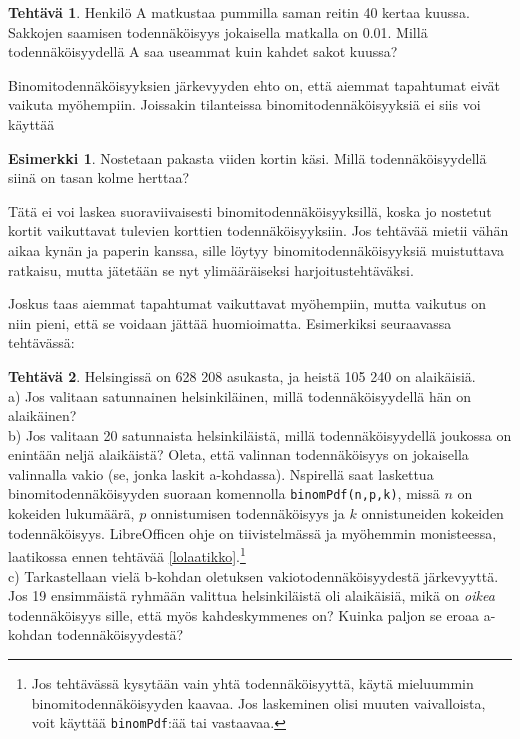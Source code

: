 \documentclass[12pt,leqno,a4paper,oneside]{amsart}
\theoremstyle{definition}
\newtheorem{example}[proclaim]{Esimerkki}
\newtheorem{exercise}{Tehtävä}
\theoremstyle{remark}
\numberwithin{equation}{section}
\begin{document}
\begin{exercise}
 Henkilö A matkustaa pummilla saman reitin 40 kertaa kuussa. Sakkojen saamisen todennäköisyys jokaisella matkalla on 0.01. Millä todennäköisyydellä
 A saa useammat kuin kahdet sakot kuussa?
\end{exercise}

Binomitodennäköisyyksien järkevyyden ehto on, että aiemmat tapahtumat eivät vaikuta myöhempiin. Joissakin tilanteissa binomi\-toden\-näköisyyksiä ei siis
voi käyttää
\begin{example}
 Nostetaan pakasta viiden kortin käsi. Millä toden\-näköisyydellä siinä on tasan kolme herttaa?
 
 Tätä ei voi laskea suoraviivaisesti binomitodennäköisyyksillä, koska jo nostetut kortit vaikuttavat tulevien korttien todennäköisyyksiin.
 Jos tehtävää mietii vähän aikaa kynän ja paperin kanssa, sille löytyy binomi\-toden\-näköisyyksiä muistuttava ratkaisu, mutta jätetään se nyt 
 yli\-määräiseksi harjoitustehtäväksi.
\end{example}

Joskus taas aiemmat tapahtumat vaikuttavat myöhempiin, mutta vaikutus on niin pieni, että se voidaan jättää huomioimatta. Esimerkiksi seuraavassa tehtävässä:

\begin{exercise}
 Helsingissä on 628 208 asukasta, ja heistä 105 240 on alaikäisiä.\\
 a) Jos valitaan satunnainen helsinkiläinen, millä todennäköisyydellä hän on alaikäinen?\\
 b) Jos valitaan 20 satunnaista helsinkiläistä, millä todennäköisyydellä joukossa on enintään neljä alaikäistä?
 Oleta, että valinnan todennäköisyys on jokaisella valinnalla vakio (se, jonka laskit 
 a-kohdassa). Nspirellä saat laskettua binomitodennäköisyyden suoraan komennolla \texttt{binomPdf(n,p,k)}, missä $n$ on kokeiden lukumäärä,
 $p$ onnistumisen todennäköisyys ja $k$ onnistuneiden kokeiden todennäköisyys. LibreOfficen ohje on tiivistelmässä ja myöhemmin monisteessa, laatikossa ennen 
 tehtävää \ref{lolaatikko}.\footnote{Jos tehtävässä kysytään vain yhtä todennäköisyyttä, käytä mieluummin binomitodennäköisyyden kaavaa.
 Jos laskeminen olisi muuten vaivalloista, voit käyttää \texttt{binomPdf}:ää tai vastaavaa.}\\
 c) Tarkastellaan vielä b-kohdan oletuksen vakiotodennäköisyydestä jär\-ke\-vyyt\-tä. Jos 19 ensimmäistä ryhmään valittua helsinkiläistä oli alaikäisiä,
 mikä on \emph{oikea} todennäköisyys sille, että myös kahdeskymmenes on? Kuinka paljon se eroaa a-kohdan todennäköisyydestä?
\end{exercise}
\end{document}
